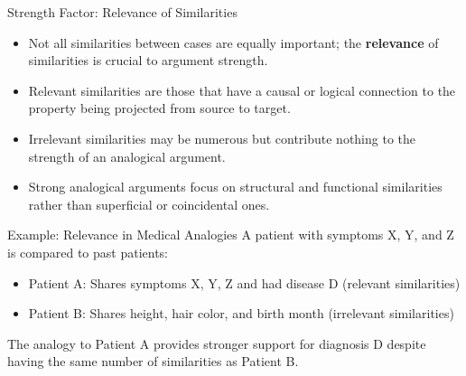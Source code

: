 \documentclass{beamer}
\begin{document}
	
	\begin{frame}{Strength Factor: Relevance of Similarities}
		\begin{itemize}
			\item Not all similarities between cases are equally important; the \textbf{relevance} of similarities is crucial to argument strength.
			\item Relevant similarities are those that have a causal or logical connection to the property being projected from source to target.
			\item Irrelevant similarities may be numerous but contribute nothing to the strength of an analogical argument.
			\item Strong analogical arguments focus on structural and functional similarities rather than superficial or coincidental ones.
		\end{itemize}
		
		\begin{exampleblock}{Example: Relevance in Medical Analogies}
			\scriptsize
			A patient with symptoms X, Y, and Z is compared to past patients:
			\begin{itemize}
				\item Patient A: Shares symptoms X, Y, Z and had disease D (relevant similarities)
				\item Patient B: Shares height, hair color, and birth month (irrelevant similarities)
			\end{itemize}
			The analogy to Patient A provides stronger support for diagnosis D despite having the same number of similarities as Patient B.
		\end{exampleblock}
	\end{frame}
	
\end{document}
